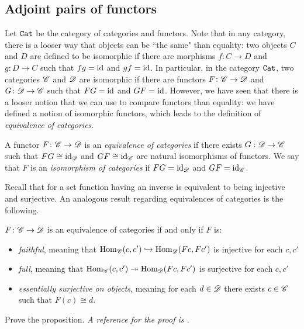 \documentclass{article}[11pt]
\begin{document}
\subsection{Adjoint pairs of functors}

Let $\texttt{Cat}$ be the category of categories and functors. Note that in any category, there is a looser way that objects can be ``the same" than equality: two objects $C$ and $D$ are defined to be isomorphic if there are morphisms $f\colon C\to D$ and $g\colon D\to C$ such that $fg=\text{id}$ and $gf=\text{id}$. In particular, in the category $\texttt{Cat}$, two categories $\mathscr{C}$ and $\mathscr{D}$ are isomorphic if there are functors $F\colon \mathscr{C}\to \mathscr{D}$ and $G\colon \mathscr{D}\to \mathscr{C}$ such that $FG=\text{id}$ and $GF=\text{id}$. However, we have seen that there is a looser notion that we can use to compare functors than equality: we have defined a notion of isomorphic functors, which leads to the definition of \emph{equivalence of categories}.

\begin{definition}\label{equivcats} A functor $F\colon \mathscr{C} \to \mathscr{D}$ is an \textit{equivalence of categories} if there exists $G : \mathscr{D} \to \mathscr{C}$ such that $FG \cong \text{id}_{\mathscr{D}}$ and $GF\cong \text{id}_{\mathscr{C}}$ are natural isomorphisms of functors. We say that $F$ is an \textit{isomorphism of categories} if $FG = \text{id}_{\mathscr{D}}$ and $GF = \text{id}_{\mathscr{C}}$.
\end{definition}

Recall that for a set function having an inverse is equivalent to being injective and surjective. An analogous result regarding equivalences of categories is the following.

\begin{proposition} $F\colon \mathscr{C} \to \mathscr{D}$ is an equivalence of categories if and only if $F$ is:
\vspace{-1em}
\begin{itemize}\itemsep0em
	\item \textit{faithful}, meaning that $\textup{Hom}_{\mathscr{C}}(c,c') \xhookrightarrow{} \textup{Hom}_{\mathscr{D}}(Fc, Fc')$ is injective for each $c,c'$
	\item \textit{full}, meaning that $\textup{Hom}_{\mathscr{C}}(c,c') \twoheadrightarrow \textup{Hom}_{\mathscr{D}}(Fc,Fc')$ is surjective for each $c,c'$
	\item \textit{essentially surjective on objects}, meaning for each $d\in \mathscr{D}$ there exists $c\in \mathscr{C}$ such that $F(c) \cong d$.
\end{itemize}
\end{proposition}

\begin{exercise}
Prove the proposition. \emph{A reference for the proof is \cite[Proposition 1]{WOMP}.}
\end{exercise}
\end{document}
